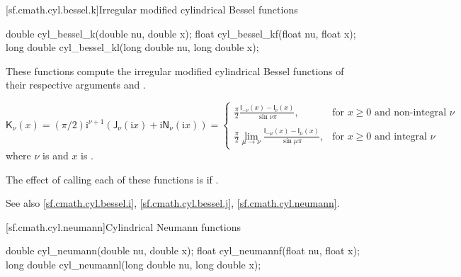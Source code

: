 [sf.cmath.cyl.bessel.k]{Irregular modified cylindrical Bessel functions}%
%
%
%
%
%
\begin{itemdecl}
double       cyl_bessel_k(double nu, double x);
float        cyl_bessel_kf(float nu, float x);
long double  cyl_bessel_kl(long double nu, long double x);
\end{itemdecl}

\begin{itemdescr}

\pnum
\effects
These functions compute
the irregular modified cylindrical Bessel functions
of their respective arguments
 and .

\pnum
\returns
\[%
  \mathsf{K}_\nu(x) =
  (\pi/2)\mathrm{i}^{\nu+1} (            \mathsf{J}_\nu(\mathrm{i}x)
			    + \mathrm{i} \mathsf{N}_\nu(\mathrm{i}x)
			    )
  =
  \left\{
  \begin{array}{cl}
  \displaystyle
  \frac{\pi}{2}
  \frac{\mathsf{I}_{-\nu}(x) - \mathsf{I}_{\nu}(x)}
       {\sin \nu\pi },
  & \mbox{for $x \ge 0$ and non-integral $\nu$}
  \\
  \\
  \displaystyle
  \frac{\pi}{2}
  \lim_{\mu \rightarrow \nu} \frac{\mathsf{I}_{-\mu}(x) - \mathsf{I}_{\mu}(x)}
                                  {\sin \mu\pi },
  & \mbox{for $x \ge 0$ and integral $\nu$}
  \end{array}
  \right.
\]
where
$\nu$ is  and
$x$ is .

\pnum
\remarks
The effect of calling each of these functions
is 
if .

\pnum
See also \ref{sf.cmath.cyl.bessel.i}, \ref{sf.cmath.cyl.bessel.j}, \ref{sf.cmath.cyl.neumann}.
\end{itemdescr}

[sf.cmath.cyl.neumann]{Cylindrical Neumann functions}%
%
%
%
%
%
%
\begin{itemdecl}
double       cyl_neumann(double nu, double x);
float        cyl_neumannf(float nu, float x);
long double  cyl_neumannl(long double nu, long double x);
\end{itemdecl}

